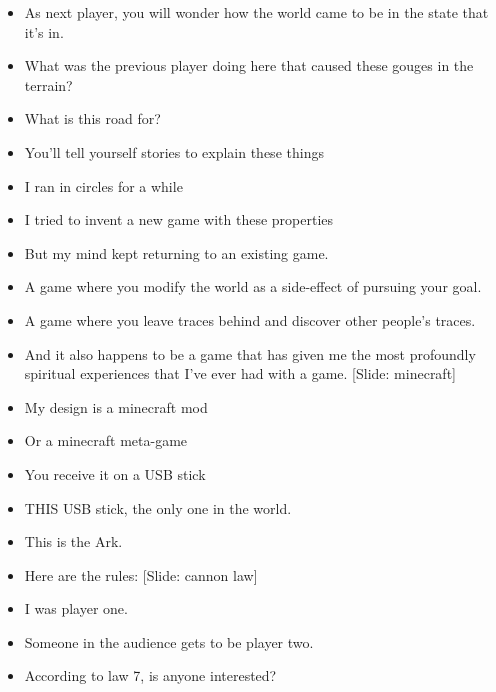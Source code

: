 \documentclass[12pt]{article}
\begin{document}
{\begin{itemize}

\item As next player, you will wonder how the world came to be in the state that it's in.

\item What was the previous player doing here that caused these gouges in the terrain?  

\item What is this road for?

\item You'll tell yourself stories to explain these things

\item I ran in circles for a while 

\item I tried to invent a new game with these properties

\item But my mind kept returning to an existing game.

\item A game where you modify the world as a side-effect of pursuing your goal.

\item A game where you leave traces behind and discover other people's traces.

\item And it also happens to be a game that has given me the most profoundly spiritual experiences that I've ever had with a game. [Slide:  minecraft]

\item My design is a minecraft mod

\item Or a minecraft meta-game

\item You receive it on a USB stick

\item THIS USB stick, the only one in the world.

\item This is the Ark.

\item Here are the rules: [Slide:  cannon law]

\item I was player one.

\item Someone in the audience gets to be player two.

\item According to law 7, is anyone interested?




\end{itemize}
}
\end{document}
